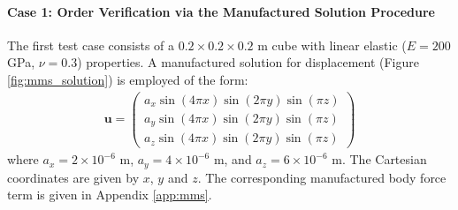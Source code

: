 \documentclass[sn-mathphys,Numbered]{sn-jnl}%
\newcommand{\bb}{\boldsymbol}
\begin{document}
\paragraph{Case 1: Order Verification via the Manufactured Solution Procedure}
The first test case consists of a $0.2 \times 0.2 \times 0.2$ m cube with linear elastic ($E = 200$ GPa, $\nu = 0.3$) properties.
A manufactured solution for displacement (Figure \ref{fig:mms_solution}) is employed of the form:
\begin{eqnarray}
	\bb{u} =
	\begin{pmatrix}
	a_x \sin(4\pi x) \sin(2\pi y) \sin(\pi z) \\
	a_y \sin(4 \pi x) \sin(2 \pi y) \sin(\pi z) \\
	a_z \sin(4 \pi x) \sin(2 \pi y) \sin(\pi z) 
	\end{pmatrix}
\end{eqnarray}
where $a_x = 2\times10^{-6}$ m, $a_y = 4\times10^{-6}$ m, and $a_z = 6\times10^{-6}$ m.
The Cartesian coordinates are given by $x$, $y$ and $z$.
The corresponding manufactured body force term is given in Appendix \ref{app:mms}.
\end{document}
